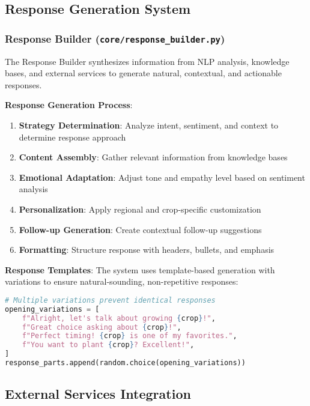 \documentclass[12pt,a4paper]{article}
\begin{document}
\subsection{Response Generation System}

\subsubsection{Response Builder (\texttt{core/response\_builder.py})}

The Response Builder synthesizes information from NLP analysis, knowledge bases, and external services to generate natural, contextual, and actionable responses.

\textbf{Response Generation Process}:
\begin{enumerate}[leftmargin=*]
    \item \textbf{Strategy Determination}: Analyze intent, sentiment, and context to determine response approach
    \item \textbf{Content Assembly}: Gather relevant information from knowledge bases
    \item \textbf{Emotional Adaptation}: Adjust tone and empathy level based on sentiment analysis
    \item \textbf{Personalization}: Apply regional and crop-specific customization
    \item \textbf{Follow-up Generation}: Create contextual follow-up suggestions
    \item \textbf{Formatting}: Structure response with headers, bullets, and emphasis
\end{enumerate}

\textbf{Response Templates}:
The system uses template-based generation with variations to ensure natural-sounding, non-repetitive responses:

\begin{lstlisting}[language=Python, caption=Response Template Example]
# Multiple variations prevent identical responses
opening_variations = [
    f"Alright, let's talk about growing {crop}!",
    f"Great choice asking about {crop}!",
    f"Perfect timing! {crop} is one of my favorites.",
    f"You want to plant {crop}? Excellent!",
]
response_parts.append(random.choice(opening_variations))
\end{lstlisting}

\subsection{External Services Integration}
\end{document}

